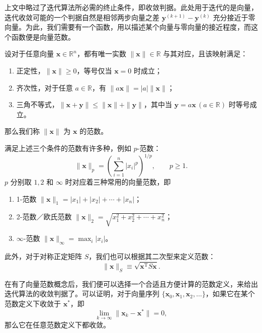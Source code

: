 上文中略过了迭代算法所必需的终止条件，即收敛判据。此处用于迭代的是向量，迭代收敛可能的一个判据自然是相邻两步向量之差 $\bm y^{(k+1)}-\bm y^{(k)}$ 充分接近于零向量。为此，我们需要有一个函数，用以描述某个向量与零向量的接近程度，而这个函数便是向量范数。

设对于任意向量 $\bm x\in\mathbb R^n$，都有唯一实数 $\|\bm x\|\in\mathbb R$ 与其对应，且该映射满足：
\begin{enumerate}
\item 正定性，$\|\bm x\|\ge0$，等号仅当 $\bm x=0$ 时成立；
\item 齐次性，对于任意 $a\in\mathbb R$，有 $\|a\bm x\|=|a|\|\bm x\|$；
\item 三角不等式，$\|\bm x+\bm y\|\le\|\bm x\|+\|\bm y\|$，其中当 $\bm y=a\bm x\,(a\in\mathbb R)$ 时等号成立。
\end{enumerate}
那么我们称 $\|\bm x\|$ 为 $\bm x$ 的范数。

满足上述三个条件的范数有许多种，例如 $p$-范数：
\begin{equation}
\|\bm x\|_p=\left(\sum_{i=1}^{n}|x_i|^p\right)^{1/p},\qquad p\ge1.
\tag{3.2.11}
\end{equation}
$p$ 分别取 $1,2$ 和 $\infty$ 时对应着三种常用的向量范数，即
\begin{enumerate}
\item 1-范数 $\|\bm x\|_1=|x_1|+|x_2|+\cdots+|x_n|$；
\item 2-范数／欧氏范数 $\|\bm x\|_2=\sqrt{x_1^2+x_2^2+\cdots+x_n^2}$；
\item $\infty$-范数 $\|\bm x\|_\infty=\max_i|x_i|$。
\end{enumerate}
此外，对于对称正定矩阵 $S$，我们也可以根据其二次型来定义范数：
\begin{equation}
\|\bm x\|_S\equiv\sqrt{\bm x^{\mathrm T}S\bm x}.
\tag{3.2.12}
\end{equation}

在有了向量范数概念后，我们便可以选择一个合适且方便计算的范数定义，来给出迭代算法的收敛判据了。可以证明，对于向量序列 $\{\bm x_0,\bm x_1,\bm x_2,\ldots\}$，如果它在某个范数定义下收敛于 $\bm x^*$，即
\begin{equation}
\lim_{k\to\infty}\|\bm x_k-\bm x^*\|=0,
\tag{3.2.13}
\end{equation}
那么它在任意范数定义下都收敛。

